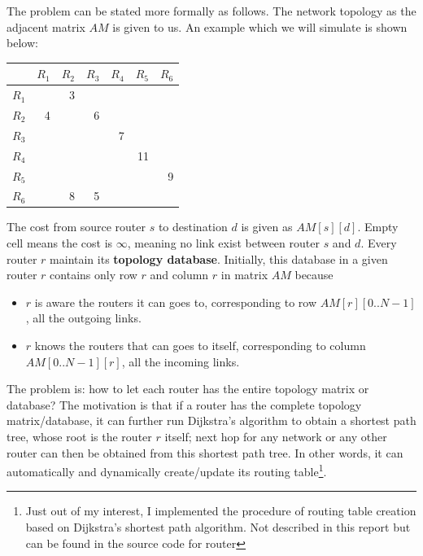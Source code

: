\documentclass[12pt]{article}  %
\theoremstyle{definition}
\theoremstyle{remark}
\begin{document}
The problem can be stated more formally as follows. The network topology as the adjacent matrix $AM$ is given to us.
An example which we will simulate is shown below:
\begin{center}
\begin{tabular}{|r|r|r|r|r|r|r|}        %
\hline                                  %
 & $R_1$ & $R_2$ & $R_3$ & $R_4$ & $R_5$ & $R_6$ \\ %
\hline
$R_1$ &   & 3 &   &   &    & \\
\hline
$R_2$ & 4 &   & 6 &   &    & \\
\hline
$R_3$ &   &   &   & 7 &    & \\
\hline
$R_4$ &   &   &   &   & 11 & \\
\hline
$R_5$ &   &   &   &   &    & 9 \\
\hline
$R_6$ &   & 8 & 5 &   &    & \\
\hline
\end{tabular}
\end{center}
The cost from source router $s$ to destination $d$ is given as $AM[s][d]$.
Empty cell means the cost is $\infty$, meaning no link exist between router $s$ and $d$.
Every router $r$ maintain its \textbf{topology database}.
Initially, this database in a given router $r$ contains only row $r$ and column $r$ in matrix $AM$ because
\begin{itemize}
        \item $r$ is aware the routers it can goes to, corresponding to row $AM[r][0..N-1]$, all the outgoing links.
        \item $r$ knows the routers that can goes to itself, corresponding to column $AM[0..N-1][r]$, all the incoming links.
\end{itemize}

The problem is: how to let each router has the entire topology matrix or database?
The motivation is that if a router has the complete topology matrix/database, it can further run Dijkstra's algorithm to obtain a shortest path tree, whose root is the router $r$ itself;
next hop for any network or any other router can then be obtained from this shortest path tree.
In other words, it can automatically and dynamically create/update its routing table\footnote{Just out of my interest, I implemented the procedure of routing table creation based on Dijkstra's shortest path algorithm.
Not described in this report but can be found in the source code for router}.
\end{document}
